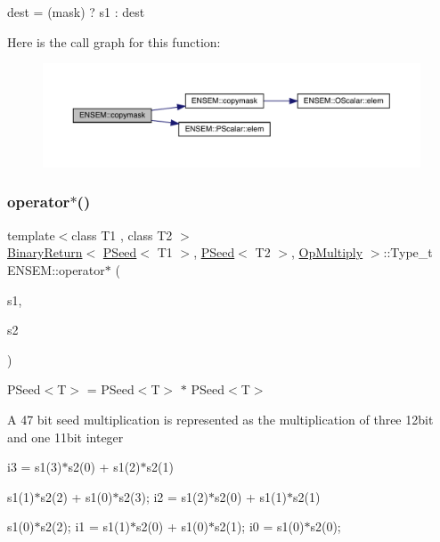 dest = (mask) ? s1 \+: dest 

Here is the call graph for this function\+:\nopagebreak
\begin{figure}[H]
\begin{center}
\leavevmode
\includegraphics[width=350pt]{df/d3c/group__primseed_gaa67a317a379bde0b069fba2359e59e2e_cgraph}
\end{center}
\end{figure}
\mbox{\label{group__primseed_ga519cf992fa84c24500a0128f1c684b8f}} 
\subsubsection{\texorpdfstring{operator$\ast$()}{operator*()}}
{\footnotesize\ttfamily template$<$class T1 , class T2 $>$ \\
\mbox{\hyperlink{structENSEM_1_1BinaryReturn}{Binary\+Return}}$<$ \mbox{\hyperlink{classENSEM_1_1PSeed}{P\+Seed}}$<$ T1 $>$, \mbox{\hyperlink{classENSEM_1_1PSeed}{P\+Seed}}$<$ T2 $>$, \mbox{\hyperlink{structENSEM_1_1OpMultiply}{Op\+Multiply}} $>$\+::Type\+\_\+t E\+N\+S\+E\+M\+::operator$\ast$ (\begin{DoxyParamCaption}\item[{const \mbox{\hyperlink{classENSEM_1_1PSeed}{P\+Seed}}$<$ T1 $>$ \&}]{s1,  }\item[{const \mbox{\hyperlink{classENSEM_1_1PSeed}{P\+Seed}}$<$ T2 $>$ \&}]{s2 }\end{DoxyParamCaption})\hspace{0.3cm}{\ttfamily [inline]}}



P\+Seed$<$\+T$>$ = P\+Seed$<$\+T$>$ $\ast$ P\+Seed$<$\+T$>$ 

A 47 bit seed multiplication is represented as the multiplication of three 12bit and one 11bit integer

i3 = s1(3)$\ast$s2(0) + s1(2)$\ast$s2(1)
\begin{DoxyItemize}
\item s1(1)$\ast$s2(2) + s1(0)$\ast$s2(3); i2 = s1(2)$\ast$s2(0) + s1(1)$\ast$s2(1)
\item s1(0)$\ast$s2(2); i1 = s1(1)$\ast$s2(0) + s1(0)$\ast$s2(1); i0 = s1(0)$\ast$s2(0);
\end{DoxyItemize}

